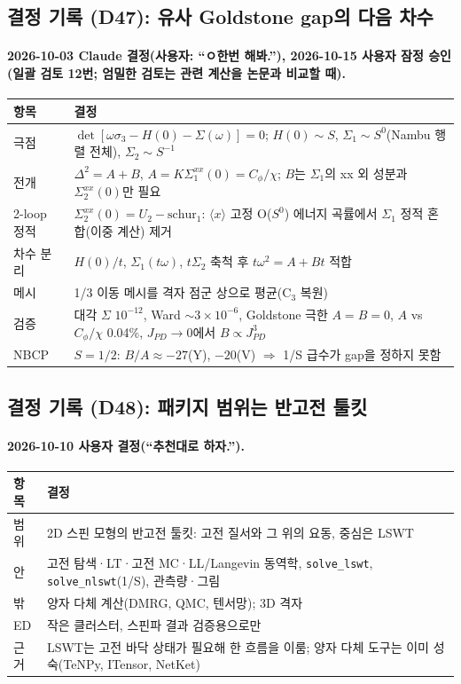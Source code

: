 \subsection{결정 기록 (D47): 유사 Goldstone gap의 다음 차수}\label{decisions-d47-pseudo-goldstone}
\begingroup%
  \framesubtitle{2026-10-03 Claude 결정(사용자: ``ㅇ한번 해봐.''), 2026-10-15 사용자 잠정 승인(일괄 검토 12번; 엄밀한 검토는 관련 계산을 논문과 비교할 때).}
  \small\renewcommand{\arraystretch}{1.12}
  \begin{tabularx}{\textwidth}{@{}P{3.0cm}Y@{}}
    \toprule
    항목 & 결정 \\
    \midrule
    극점 & $\det[\omega\sigma_3-H(0)-\Sigma(\omega)]=0$; $H(0)\sim S$, $\Sigma_1\sim S^0$(Nambu 행렬 전체), $\Sigma_2\sim S^{-1}$ \\
    전개 & $\Delta^2=A+B$, $A=K\Sigma_1^{xx}(0)=C_\phi/\chi$; $B$는 $\Sigma_1$의 xx 외 성분과 $\Sigma_2^{xx}(0)$만 필요 \\
    2-loop 정적 & $\Sigma_2^{xx}(0)=U_2-\mathrm{schur}_1$: $\langle x\rangle$ 고정 O($S^0$) 에너지 곡률에서 $\Sigma_1$ 정적 혼합(이중 계산) 제거 \\
    차수 분리 & $H(0)/t$, $\Sigma_1(t\omega)$, $t\Sigma_2$ 축척 후 $t\omega^2=A+Bt$ 적합 \\
    메시 & 1/3 이동 메시를 격자 점군 상으로 평균(C$_3$ 복원) \\
    검증 & 대각 $\Sigma$ $10^{-12}$, Ward $\sim3\times10^{-6}$, Goldstone 극한 $A=B=0$, $A$ vs $C_\phi/\chi$ 0.04\%, $J_{PD}\to0$에서 $B\propto J_{PD}^3$ \\
    NBCP & $S=1/2$: $B/A\approx-27$(Y), $-20$(V) $\Rightarrow$ 1/S 급수가 gap을 정하지 못함 \\
    \bottomrule
  \end{tabularx}
\endgroup


\subsection{결정 기록 (D48): 패키지 범위는 반고전 툴킷}\label{decisions-d48-scope}
\begingroup%
  \framesubtitle{2026-10-10 사용자 결정(``추천대로 하자.'').}
  \small\renewcommand{\arraystretch}{1.12}
  \begin{tabularx}{\textwidth}{@{}P{3.0cm}Y@{}}
    \toprule
    항목 & 결정 \\
    \midrule
    범위 & 2D 스핀 모형의 반고전 툴킷: 고전 질서와 그 위의 요동, 중심은 LSWT \\
    안 & 고전 탐색·LT·고전 MC·LL/Langevin 동역학, \texttt{solve\_lswt}, \texttt{solve\_nlswt}(1/S), 관측량·그림 \\
    밖 & 양자 다체 계산(DMRG, QMC, 텐서망); 3D 격자 \\
    ED & 작은 클러스터, 스핀파 결과 검증용으로만 \\
    근거 & LSWT는 고전 바닥 상태가 필요해 한 흐름을 이룸; 양자 다체 도구는 이미 성숙(TeNPy, ITensor, NetKet) \\
    \bottomrule
  \end{tabularx}
\endgroup


